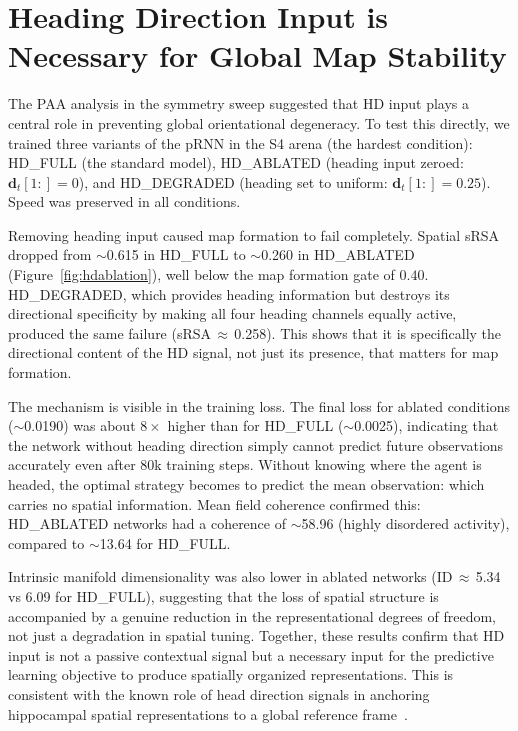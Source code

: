 \documentclass[11pt, a4paper]{article}
\begin{document}
\section*{Heading Direction Input is Necessary for Global Map Stability}
\label{sec:hdablation}

The PAA analysis in the symmetry sweep suggested that HD input plays a
central role in preventing global orientational degeneracy. To test this
directly, we trained three variants of the pRNN in the S4 arena (the
hardest condition): HD\_FULL (the standard model), HD\_ABLATED (heading
input zeroed: $\mathbf{d}_t[1:] = 0$), and HD\_DEGRADED (heading set to
uniform: $\mathbf{d}_t[1:] = 0.25$). Speed was preserved in all
conditions.

Removing heading input caused map formation to fail completely. Spatial
sRSA dropped from $\sim$0.615 in HD\_FULL to
$\sim$0.260 in HD\_ABLATED (Figure~\ref{fig:hdablation}),
well below the map formation gate of $0.40$. HD\_DEGRADED, which provides
heading information but destroys its directional specificity by making all
four heading channels equally active, produced the same failure
(sRSA\,$\approx$\,0.258). This shows that it is
specifically the directional content of the HD signal, not just its
presence, that matters for map formation.

The mechanism is visible in the training loss. The final loss for ablated
conditions ($\sim$0.0190) was about $8\times$ higher than
for HD\_FULL ($\sim$0.0025), indicating that the network
without heading direction simply cannot predict future observations
accurately even after 80k training steps. Without knowing where the agent
is headed, the optimal strategy becomes to predict the mean observation:
which carries no spatial information. Mean field coherence confirmed this:
HD\_ABLATED networks had a coherence of $\sim$58.96
(highly disordered activity), compared to $\sim$13.64 for
HD\_FULL.

Intrinsic manifold dimensionality was also lower in ablated networks
(ID\,$\approx$\,5.34 vs 6.09 for
HD\_FULL), suggesting that the loss of spatial structure is accompanied by
a genuine reduction in the representational degrees of freedom, not just
a degradation in spatial tuning. Together, these results confirm that HD
input is not a passive contextual signal but a necessary input for the
predictive learning objective to produce spatially organized representations.
This is consistent with the known role of head direction signals in
anchoring hippocampal spatial representations to a global reference
frame~\citep{lever2002}.
\end{document}
